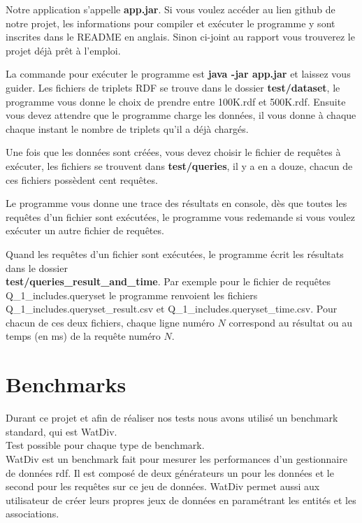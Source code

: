 \documentclass[12pt]{report}
\begin{document}
Notre application s'appelle \textbf{app.jar}. Si vous voulez accéder au lien github de notre projet, les informations pour compiler et exécuter le programme y sont inscrites dans le README en anglais. Sinon ci-joint au rapport vous trouverez le projet déjà prêt à l'emploi. 

La commande pour exécuter le programme est \textbf{java -jar app.jar} et laissez vous guider. Les fichiers de triplets RDF se trouve dans le dossier \textbf{test/dataset}, le programme vous donne le choix de prendre entre 100K.rdf et 500K.rdf. Ensuite vous devez attendre que le programme charge les données, il vous donne à chaque chaque instant le nombre de triplets qu'il a déjà chargés. 

Une fois que les données sont créées, vous devez choisir le fichier de requêtes à exécuter, les fichiers se trouvent dans \textbf{test/queries}, il y a en a douze, chacun de ces fichiers possèdent cent requêtes.

Le programme vous donne une trace des résultats en console, dès que toutes les requêtes d'un fichier sont exécutées, le programme vous redemande si vous voulez exécuter un autre fichier de requêtes.

Quand les requêtes d'un fichier sont exécutées, le programme écrit les résultats dans le dossier \\
\textbf{test/queries\_result\_and\_time}. Par exemple pour le fichier de requêtes \\Q\_1\_includes.queryset le programme renvoient les fichiers Q\_1\_includes.queryset\_result.csv et Q\_1\_includes.queryset\_time.csv. Pour chacun de ces deux fichiers, chaque ligne numéro $N$ correspond au résultat ou au temps (en ms) de la requête numéro $N$.

\section{Benchmarks}
Durant ce projet et afin de réaliser nos tests nous avons utilisé un benchmark standard, qui est WatDiv.\\
Test possible pour chaque type de benchmark.\\
WatDiv est un benchmark fait pour mesurer les performances d’un gestionnaire de données rdf. Il est composé de deux  générateurs un pour les données et le second pour les requêtes sur ce jeu de données. WatDiv permet aussi aux utilisateur de créer leurs propres jeux de données en paramétrant les entités et les associations.\\
\end{document}
